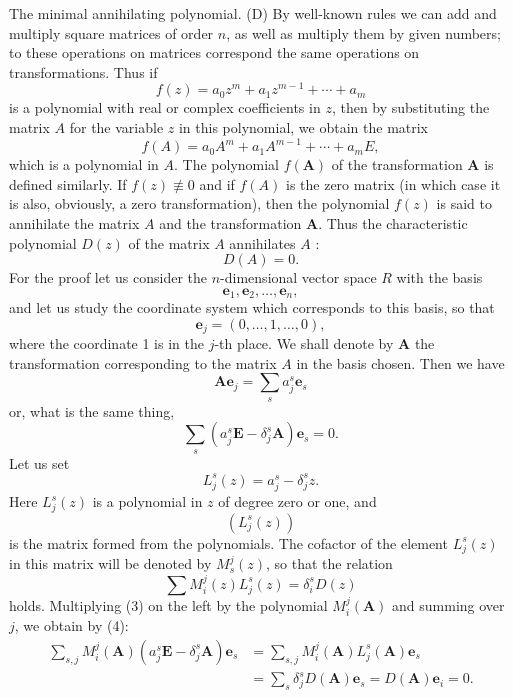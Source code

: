\documentclass[10pt,a5paper]{book}
\theoremstyle{plain}
\theoremstyle{definition}
\theoremstyle{remark}
\begin{document}
The minimal annihilating polynomial. (D) By well-known rules we can add and multiply square matrices of order $n$, as well as multiply them by given numbers; to these operations on matrices correspond the same operations on transformations. Thus if
\[
f(z)=a_{0} z^{m}+a_{1} z^{m-1}+\cdots+a_{m}
\]
is a polynomial with real or complex coefficients in $z$, then by substituting the matrix $A$ for the variable $z$ in this polynomial, we obtain the matrix
\[
f(A)=a_{0} A^{m}+a_{1} A^{m-1}+\cdots+a_{m} E,
\]
which is a polynomial in $A$. The polynomial $f(\mathbf{A})$ of the transformation $\mathbf{A}$ is defined similarly. If $f(z) \not \equiv 0$ and if $f(A)$ is the zero matrix (in which case it is also, obviously, a zero transformation), then the polynomial $f(z)$ is said to annihilate the matrix $A$ and the transformation $\mathbf{A}$. Thus the characteristic polynomial $D(z)$ of the matrix $A$ annihilates $A$ :
\[
D(A)=0 .
\]
For the proof let us consider the $n$-dimensional vector space $R$ with the basis
\[
\mathbf{e}_{1}, \mathbf{e}_{2}, \ldots, \mathbf{e}_{n},
\]
and let us study the coordinate system which corresponds to this basis, so that
\[
\mathbf{e}_{j}=(0, \ldots, 1, \ldots, 0),
\]
where the coordinate 1 is in the $j$-th place. We shall denote by $\mathbf{A}$ the transformation corresponding to the matrix $A$ in the basis chosen. Then we have
\[
\mathbf{A e}_{j}=\sum_{s} a_{j}^{s} \mathbf{e}_{s}
\]
or, what is the same thing,
\begin{equation*}
\sum_{s}\left(a_{j}^{s} \mathbf{E}-\delta_{j}^{s} \mathbf{A}\right) \mathbf{e}_{s}=0 . \tag{3}
\end{equation*}
Let us set
\[
L_{j}^{s}(z)=a_{j}^{s}-\delta_{j}^{s} z .
\]
Here $L_{j}^{s}(z)$ is a polynomial in $z$ of degree zero or one, and
\[
\left(L_{j}^{s}(z)\right)
\]
is the matrix formed from the polynomials. The cofactor of the element $L_{j}^{s}(z)$ in this matrix will be denoted by $M_{s}^{j}(z)$, so that the relation
\begin{equation*}
\sum M_{i}^{j}(z) L_{j}^{s}(z)=\delta_{i}^{s} D(z) \tag{4}
\end{equation*}
holds. Multiplying (3) on the left by the polynomial $M_{i}^{j}(\mathbf{A})$ and summing over $j$, we obtain by (4):
\[
\begin{aligned}
\sum_{s, j} M_{i}^{j}(\mathbf{A})\left(a_{j}^{s} \mathbf{E}-\delta_{j}^{s} \mathbf{A}\right) \mathbf{e}_{s} & =\sum_{s, j} M_{i}^{j}(\mathbf{A}) L_{j}^{s}(\mathbf{A}) \mathbf{e}_{s} \\
& =\sum_{s} \delta_{j}^{s} D(\mathbf{A}) \mathbf{e}_{s}=D(\mathbf{A}) \mathbf{e}_{i}=0 .
\end{aligned}
\]
\end{document}
